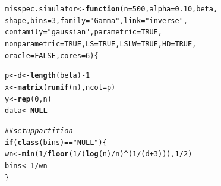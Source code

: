 \documentclass[11pt]{article}\usepackage[]{graphicx}\usepackage[]{color}
\makeatletter
\newcommand{\hlnum}[1]{\textcolor[rgb]{0.686,0.059,0.569}{#1}}%
\newcommand{\hlstr}[1]{\textcolor[rgb]{0.192,0.494,0.8}{#1}}%
\newcommand{\hlcom}[1]{\textcolor[rgb]{0.678,0.584,0.686}{\textit{#1}}}%
\newcommand{\hlopt}[1]{\textcolor[rgb]{0,0,0}{#1}}%
\newcommand{\hlstd}[1]{\textcolor[rgb]{0.345,0.345,0.345}{#1}}%
\newcommand{\hlkwa}[1]{\textcolor[rgb]{0.161,0.373,0.58}{\textbf{#1}}}%
\newcommand{\hlkwb}[1]{\textcolor[rgb]{0.69,0.353,0.396}{#1}}%
\newcommand{\hlkwc}[1]{\textcolor[rgb]{0.333,0.667,0.333}{#1}}%
\newcommand{\hlkwd}[1]{\textcolor[rgb]{0.737,0.353,0.396}{\textbf{#1}}}%
\newenvironment{kframe}{%
 \def\at@end@of@kframe{}%
 \ifinner\ifhmode%
  \def\at@end@of@kframe{\end{minipage}}%
  \begin{minipage}{\columnwidth}%
 \fi\fi%
 \def\FrameCommand##1{\hskip\@totalleftmargin \hskip-\fboxsep
 \colorbox{shadecolor}{##1}\hskip-\fboxsep
     \hskip-\linewidth \hskip-\@totalleftmargin \hskip\columnwidth}%
 \MakeFramed {\advance\hsize-\width
   \@totalleftmargin\z@ \linewidth\hsize
   \@setminipage}}%
 {\par\unskip\endMakeFramed%
 \at@end@of@kframe}
\newenvironment{knitrout}{}{} %
\makeatother
\begin{document}
\begin{knitrout}
\color{fgcolor}\begin{kframe}
\begin{alltt}
\hlstd{misspec.simulator} \hlkwb{<-} \hlkwa{function}\hlstd{(}\hlkwc{n} \hlstd{=} \hlnum{500}\hlstd{,} \hlkwc{alpha} \hlstd{=} \hlnum{0.10}\hlstd{,} \hlkwc{beta}\hlstd{,}
  \hlkwc{shape}\hlstd{,} \hlkwc{bins} \hlstd{=} \hlnum{3}\hlstd{,} \hlkwc{family} \hlstd{=} \hlstr{"Gamma"}\hlstd{,} \hlkwc{link} \hlstd{=} \hlstr{"inverse"}\hlstd{,}
  \hlkwc{confamily} \hlstd{=} \hlstr{"gaussian"}\hlstd{,} \hlkwc{parametric} \hlstd{=} \hlnum{TRUE}\hlstd{,}
  \hlkwc{nonparametric} \hlstd{=} \hlnum{TRUE}\hlstd{,} \hlkwc{LS} \hlstd{=} \hlnum{TRUE}\hlstd{,} \hlkwc{LSLW} \hlstd{=} \hlnum{TRUE}\hlstd{,} \hlkwc{HD} \hlstd{=} \hlnum{TRUE}\hlstd{,}
  \hlkwc{oracle} \hlstd{=} \hlnum{FALSE}\hlstd{,} \hlkwc{cores} \hlstd{=} \hlnum{6}\hlstd{)\{}

  \hlstd{p} \hlkwb{<-} \hlstd{d} \hlkwb{<-} \hlkwd{length}\hlstd{(beta)} \hlopt{-} \hlnum{1}
  \hlstd{x} \hlkwb{<-} \hlkwd{matrix}\hlstd{(}\hlkwd{runif}\hlstd{(n),} \hlkwc{ncol} \hlstd{= p)}
  \hlstd{y} \hlkwb{<-} \hlkwd{rep}\hlstd{(}\hlnum{0}\hlstd{,n)}
  \hlstd{data} \hlkwb{<-} \hlkwa{NULL}

  \hlcom{## set up partition}
  \hlkwa{if}\hlstd{(}\hlkwd{class}\hlstd{(bins)} \hlopt{==} \hlstr{"NULL"}\hlstd{)\{}
    \hlstd{wn} \hlkwb{<-} \hlkwd{min}\hlstd{(}\hlnum{1}\hlopt{/} \hlkwd{floor}\hlstd{(}\hlnum{1} \hlopt{/} \hlstd{(}\hlkwd{log}\hlstd{(n)}\hlopt{/}\hlstd{n)}\hlopt{^}\hlstd{(}\hlnum{1}\hlopt{/}\hlstd{(d}\hlopt{+}\hlnum{3}\hlstd{))),} \hlnum{1}\hlopt{/}\hlnum{2}\hlstd{)}
    \hlstd{bins} \hlkwb{<-} \hlnum{1} \hlopt{/} \hlstd{wn}
  \hlstd{\}}


\end{alltt}
\end{kframe}
\end{knitrout}
\end{document}

